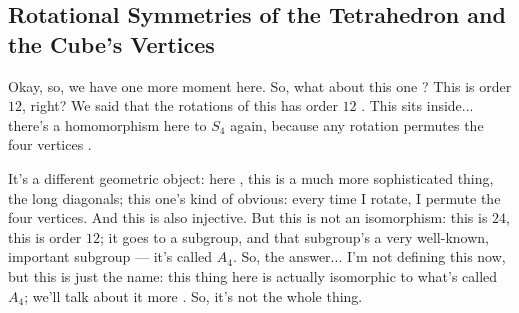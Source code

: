 \begin{hidden}
\end{hidden}

\subsection{Rotational Symmetries of the Tetrahedron and the Cube's Vertices}

\begin{speech}[00:42:34 - 00:43:31]
Okay, so, we have one more moment here. So, what about this one ? This is order $12$, right? We said that the rotations of this has order $12$ . This sits inside... there's a homomorphism here to $S_4$ again, because any rotation permutes the four vertices .

It's a different geometric object: here , this is a much more sophisticated thing, the long diagonals; this one's kind of obvious: every time I rotate, I permute the four vertices. And this is also injective. But this is not an isomorphism: this is $24$, this is order $12$; it goes to a subgroup, and that subgroup's a very well-known, important subgroup --- it's called $A_4$. So, the answer... I'm not defining this now, but this is just the name: this thing here is actually isomorphic to what's called $A_4$; we'll talk about it more . So, it's not the whole thing.
\end{speech}


